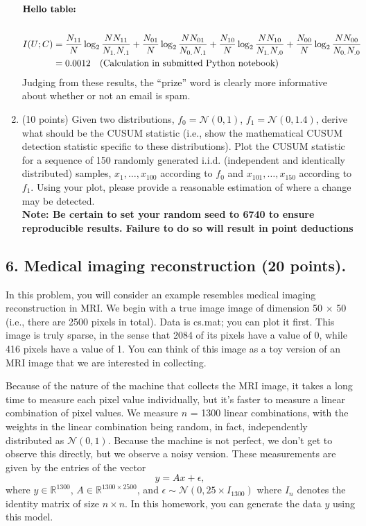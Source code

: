 \documentclass[twoside,10pt]{article}
\begin{document}
\begin{enumerate}
\begin{align*}
\intertext{\bf Hello table:} \\
I(U;C) &= \frac{N_{11}}{N} \log_2 \frac{N N_{11}}{N_{1.} N_{.1}} + 
    \frac{N_{01}}{N} \log_2 \frac{N N_{01}}{N_{0.} N_{.1}} +
    \frac{N_{10}}{N} \log_2 \frac{N N_{10}}{N_{1.} N_{.0}} +
    \frac{N_{00}}{N} \log_2 \frac{N N_{00}}{N_{0.} N_{.0}} \\
     &= 0.0012 \quad \text{(Calculation in submitted Python notebook)}
\end{align*}
Judging from these results, the ``prize'' word is clearly more informative about whether or not an email is spam.

\item  (10 points)  Given two distributions, $f_0 = \mathcal{N}(0, 1)$, $f_1 = \mathcal{N}(0, 1.4)$, derive what should be the CUSUM statistic (i.e., show the mathematical CUSUM detection statistic specific to these distributions). Plot the CUSUM statistic for a sequence of 150 randomly generated i.i.d. (independent and identically distributed) samples, $x_1, \ldots, x_{100}$ according to $f_0$ and $x_{101}, \ldots, x_{150}$ according to $f_1$. Using your plot, please provide a reasonable estimation of where a change may be detected.\\
\textbf{Note: Be certain to set your random seed to 6740 to ensure reproducible results. Failure to do so will result in point deductions}


\end{enumerate}


\subsection*{6. Medical imaging reconstruction (20 points).} 

In this problem, you will consider an example resembles medical imaging reconstruction in MRI.  We begin with a true image image of dimension 50 $\times$ 50 (i.e., there are 2500 pixels in total). Data is \textsf{cs.mat}; you can plot it first. This image is truly sparse, in the sense that 2084 of its pixels have a value of 0, while 416 pixels have a value of 1. You can think of this image as a toy version of an MRI image that we are interested in collecting.

Because of the nature of the machine that collects the MRI image, it takes a long time to measure each pixel value individually, but it's faster to measure a linear combination of pixel values. We measure $n$ = 1300 linear combinations, with the weights in the linear combination being random, in fact, independently distributed as $\mathcal{N}(0,1)$. Because the machine is not perfect, we don't get to observe this directly, but we observe a noisy version. These measurements are given by the entries of the vector
\[
y = A x + \epsilon,
\]
where $y \in \mathbb R^{1300}$, $A \in \mathbb R^{1300\times 2500}$, and $\epsilon \sim \mathcal N(0, 25\times I_{1300})$ where $I_n$ denotes the identity matrix of size $n\times n$. In this homework, you can generate the data $y$ using this model. 
\end{document}
